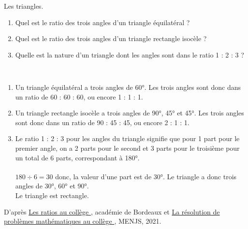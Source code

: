 \begin{exercice*}
   Les triangles.
   \begin{enumerate}
      \item Quel est le ratio des trois angles d’un triangle équilatéral ?
      \item Quel est le ratio des trois angles d’un triangle rectangle isocèle ?
      \item Quelle est la nature d’un triangle dont les angles sont dans le ratio 1 : 2 : 3 ?
   \end{enumerate}
\end{exercice*}

\begin{corrige}
\ \\ [-5mm]
   \begin{enumerate}
      \item Un triangle équilatéral a trois angles de \ang{60}. Les trois angles sont donc dans un ratio de 60 : 60 : 60, ou encore {\color{red} 1 : 1 : 1}.
      \item Un triangle rectangle isocèle a trois angles de \ang{90}, \ang{45} et \ang{45}. Les trois angles sont donc dans un ratio de 90 : 45 : 45, ou encore {\color{red} 2 : 1 : 1}.
      \item Le ratio 1 : 2 : 3 pour les angles du triangle signifie que pour 1 part pour le premier angle, on a 2 parts pour le second et 3 parts pour le troisième pour un total de 6 parts, correspondant à \ang{180}. \\ [2mm]
            \quad {} \\
         $180\div6 =30$ donc, la valeur d'une part est de \ang{30}. Le triangle a donc trois angles de \ang{30}, \ang{60} et \ang{90}.\\
         {\color{red} Le triangle est rectangle.} 
   \end{enumerate}
\end{corrige}

\vfill\hfill{\footnotesize D'après \href{https://ent2d.ac-bordeaux.fr/disciplines/mathematiques/les-ratios-au-college/}{\og Les ratios au collège \fg}, académie de Bordeaux et \href{https://eduscol.education.fr/document/13132/download}{\og La résolution de problèmes mathématiques au collège \fg}, MENJS, 2021.}